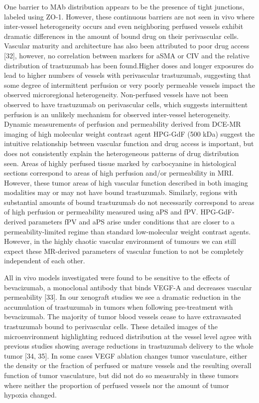 One barrier to MAb distribution appears to be the presence of tight junctions, labeled using ZO-1.
However, these continuous barriers are not seen in vivo where inter-vessel heterogeneity occurs and even neighboring perfused vessels exhibit dramatic differences in the amount of bound drug on their perivascular cells.
Vascular maturity and architecture has also been attributed to poor drug access [32], however, no correlation between markers for aSMA or CIV and the relative distribution of trastuzumab has been found.Higher doses and longer exposures do lead to higher numbers of vessels with perivascular trastuzumab, suggesting that some degree of intermittent perfusion or very poorly permeable vessels impact the observed microregional heterogeneity.
Non-perfused vessels have not been observed to have trastuzumab on perivascular cells, which suggests intermittent perfusion is an unlikely mechanism for observed inter-vessel heterogeneity.
Dynamic measurements of perfusion and permeability derived from DCE-MR imaging of high molecular weight contrast agent HPG-GdF (500 kDa) suggest the intuitive relationship between vascular function and drug access is important, but does not consistently explain the heterogeneous patterns of drug distribution seen.
Areas of highly perfused tissue marked by carbocyanine in histological sections correspond to areas of high perfusion and/or permeability in MRI.
However, these tumor areas of high vascular function described in both imaging modalities may or may not have bound trastuzumab.
Similarly, regions with substantial amounts of bound trastuzumab do not necessarily correspond to areas of high perfusion or permeability measured using aPS and fPV.
HPG-GdF-derived parameters fPV and aPS arise under conditions that are closer to a permeability-limited regime than standard low-molecular weight contrast agents.
However, in the highly chaotic vascular environment of tumours we can still expect these MR-derived parameters of vascular function to not be completely independent of each other.

All in vivo models investigated were found to be sensitive to the effects of bevacizumab, a monoclonal antibody that binds VEGF-A and decreases vascular permeability [33].
In our xenograft studies we see a dramatic reduction in the accumulation of trastuzumab in tumors when following pre-treatment with bevacizumab.
The majority of tumor blood vessels cease to have extravasated trastuzumab bound to perivascular cells.
These detailed images of the microenvironment highlighting reduced distribution at the vessel level agree with previous studies showing average reductions in trastuzumab delivery to the whole tumor [34, 35].
In some cases VEGF ablation changes tumor vasculature, either the density or the fraction of perfused or mature vessels and the resulting overall function of tumor vasculature, but did not do so measurably in these tumors where neither the proportion of perfused vessels nor the amount of tumor hypoxia changed.


